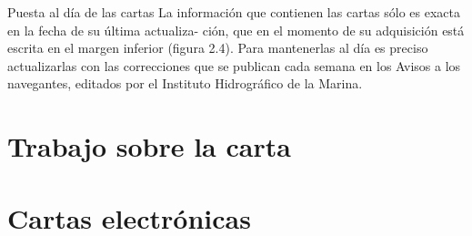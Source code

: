 Puesta al día de las cartas 
La información que contienen las cartas sólo es exacta en la fecha de su última actualiza- 
ción, que en el momento de su adquisición está escrita en el margen inferior (figura 2.4). 
Para mantenerlas al día es preciso actualizarlas con las correcciones que se publican cada 
semana en los Avisos a los navegantes, editados por el Instituto Hidrográfico de la 
Marina. 

\section{Trabajo sobre la carta}


\section{Cartas electrónicas}
